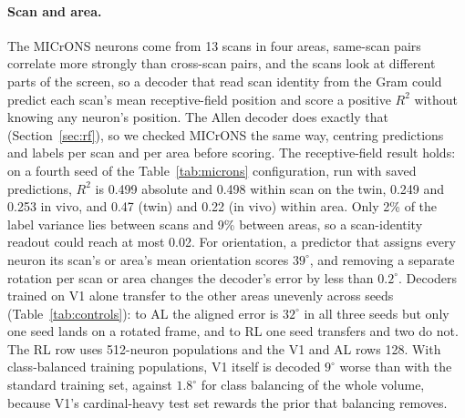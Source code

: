 \documentclass[11pt]{article}
\newcommand{\Rsq}{R^{2}}
\begin{document}
\paragraph{Scan and area.} The MICrONS neurons come from 13 scans in four areas, same-scan pairs correlate more strongly than cross-scan pairs, and the scans look at different parts of the screen, so a decoder that read scan identity from the Gram could predict each scan's mean receptive-field position and score a positive $\Rsq$ without knowing any neuron's position. The Allen decoder does exactly that (Section~\ref{sec:rf}), so we checked MICrONS the same way, centring predictions and labels per scan and per area before scoring. The receptive-field result holds: on a fourth seed of the Table~\ref{tab:microns} configuration, run with saved predictions, $\Rsq$ is 0.499 absolute and 0.498 within scan on the twin, 0.249 and 0.253 in vivo, and 0.47 (twin) and 0.22 (in vivo) within area. Only 2\% of the label variance lies between scans and 9\% between areas, so a scan-identity readout could reach at most 0.02. For orientation, a predictor that assigns every neuron its scan's or area's mean orientation scores $39^\circ$, and removing a separate rotation per scan or area changes the decoder's error by less than $0.2^\circ$. Decoders trained on V1 alone transfer to the other areas unevenly across seeds (Table~\ref{tab:controls}): to AL the aligned error is $32^\circ$ in all three seeds but only one seed lands on a rotated frame, and to RL one seed transfers and two do not. The RL row uses 512-neuron populations and the V1 and AL rows 128. With class-balanced training populations, V1 itself is decoded $9^\circ$ worse than with the standard training set, against $1.8^\circ$ for class balancing of the whole volume, because V1's cardinal-heavy test set rewards the prior that balancing removes.
\end{document}
